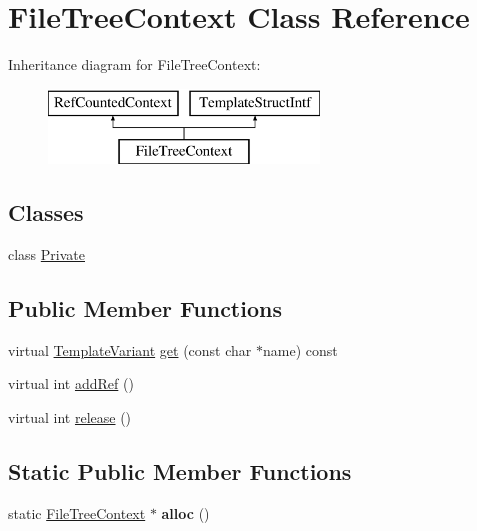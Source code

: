 \hypertarget{class_file_tree_context}{}\section{File\+Tree\+Context Class Reference}
\label{class_file_tree_context}
Inheritance diagram for File\+Tree\+Context\+:\begin{figure}[H]
\begin{center}
\leavevmode
\includegraphics[height=2.000000cm]{class_file_tree_context}
\end{center}
\end{figure}
\subsection*{Classes}
\begin{DoxyCompactItemize}
\item 
class \mbox{\hyperlink{class_file_tree_context_1_1_private}{Private}}
\end{DoxyCompactItemize}
\subsection*{Public Member Functions}
\begin{DoxyCompactItemize}
\item 
virtual \mbox{\hyperlink{class_template_variant}{Template\+Variant}} \mbox{\hyperlink{class_file_tree_context_a6809056d3dc7adac668e0d28dd2575f5}{get}} (const char $\ast$name) const
\item 
virtual int \mbox{\hyperlink{class_file_tree_context_a01aadccccf538d37ddfea3d4c4149e1f}{add\+Ref}} ()
\item 
virtual int \mbox{\hyperlink{class_file_tree_context_ac5ef9e8a6df42e2ee5c9f7c0fe33545c}{release}} ()
\end{DoxyCompactItemize}
\subsection*{Static Public Member Functions}
\begin{DoxyCompactItemize}
\item 
\mbox{\label{class_file_tree_context_a63cfb1c931ee4ad78cc6fa745cb1b409}} 
static \mbox{\hyperlink{class_file_tree_context}{File\+Tree\+Context}} $\ast$ {\bfseries alloc} ()
\end{DoxyCompactItemize}


